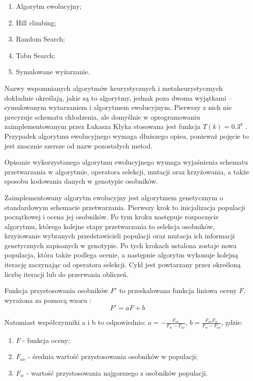\begin{enumerate}
	\item Algorytm ewolucyjny;
	\item Hill climbing;
	\item Random Search;
	\item Tabu Search; 
	\item Symulowane wyżarzanie.
\end{enumerate}

\par
Nazwy wspomnianych algorytmów heurystycznych i metaheurystycznych dokładnie określają, jakie są to algorytmy, jednak poza dwoma wyjątkami -- symulowanym wyżarzaniem i algorytmem ewolucyjnym.
Pierwszy z nich nie precyzuje schematu chłodzenia, ale domyślnie w oprogramowaniu zaimplementowanym przez Łukasza Kłyka stosowana jest funkcja \( T(k) = 0.3^{k} \) \cite[str. 36]{klyk}.
Przypadek algorytmu ewolucyjnego wymaga dłuższego opisu, ponieważ pojęcie to jest znacznie szersze od nazw pozostałych metod.

\par
Opisanie wykorzystanego algorytmu ewolucyjnego wymaga wyjaśnienia schematu przetwarzania w algorytmie, operatora selekcji, mutacji oraz krzyżowania, a także sposobu kodowania danych w genotypie osobników.

\par
Zaimplementowany algorytm ewolucyjny jest algorytmem genetycznym o standardowym schemacie przetwarzania.
Pierwszy krok to inicjalizacja populacji początkowej i ocena jej osobników.
Po tym kroku następuje rozpoczęcie algorytmu, którego kolejne etapy przetwarzania to selekcja osobników, krzyżowanie wybranych przedstawicieli populacji oraz mutacja ich informacji genetycznych zapisanych w genotypie.
Po tych krokach ustalona zostaje nowa populacja, która także podlega ocenie, a następnie algorytm wykonuje kolejną iterację zaczynając od operatora selekcji.
Cykl jest powtarzany przez określoną liczbę iteracji lub do przerwania obliczeń.

\par
Funkcja przystosowania osobników \( F' \) to przeskalowana funkcja liniowa oceny \( F \), wyrażona za pomocą wzoru \cite[str. 28]{klyk}:
$$ F' = aF + b $$

Natomiast współczynniki a i b to odpowiednio:
$ a = - \frac{F_{av}}{F_{w} - F_{av}} $,
$ b = \frac{F_{av}F_{w}}{F_{w} - F_{av}} $, gdzie:

\begin{enumerate}
	\item \( F \) - funkcja oceny;
	\item \( F_{av} \) - średnia wartość przystosowania osobników w populacji;
	\item \( F_{w} \) - wartość przystosowania najgorszego z osobników populacji.
\end{enumerate}

